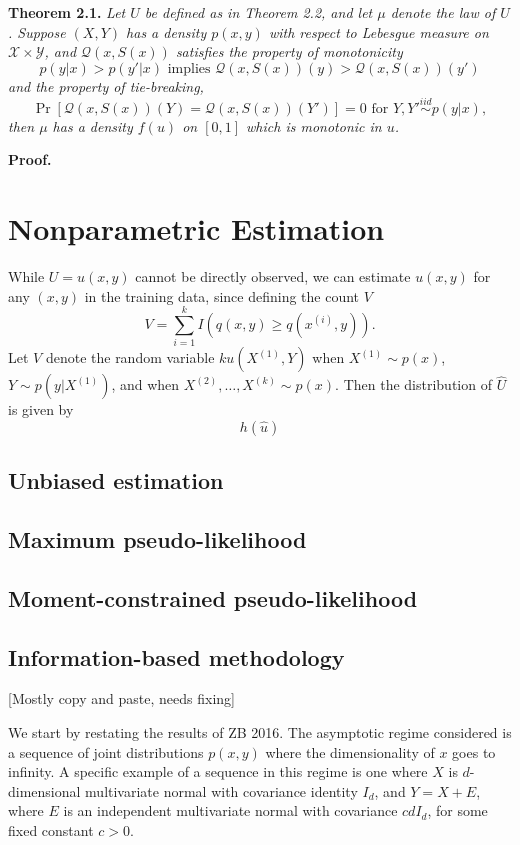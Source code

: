 \documentclass{article}
\begin{document}
\noindent\textbf{Theorem 2.1.} \emph{ Let $U$ be defined as in Theorem
  2.2, and let $\mu$ denote the law of $U$.  Suppose $(X, Y)$ has a density $p(x, y)$ with respect to 
  Lebesgue measure on $\mathcal{X} \times \mathcal{Y}$,
  and $\mathcal{Q}(x, S(x))$ satisfies the property of monotonicity
  \[
  p(y|x) > p(y'|x) \text{ implies } \mathcal{Q}(x, S(x))(y) > \mathcal{Q}(x, S(x))(y')
  \]
  and the property of tie-breaking,
  \[
  \Pr[\mathcal{Q}(x, S(x))(Y) = \mathcal{Q}(x, S(x))(Y')] = 0\text{ for }Y, Y' \stackrel{iid}{\sim} p(y|x),
  \]
  then $\mu$ has a density $f(u)$ on $[0, 1]$ which is monotonic in $u$.
}

\noindent\textbf{Proof.}


\section{Nonparametric Estimation}

While $U = u(x, y)$ cannot be directly observed, we can estimate $u(x, y)$ for any $(x, y)$ in the training data,
since defining the count $V$
\[
V = \sum_{i=1}^k I(q(x, y) \geq q(x^{(i)}, y)).
\]
Let $V$ denote the random variable $k u(X^{(1)}, Y)$ when $X^{(1)} \sim p(x)$,
$Y \sim p(y|X^{(1)})$, and when $X^{(2)},\hdots, X^{(k)} \sim p(x)$.
Then the distribution of $\hat{U}$ is given by
\[
h(\hat{u})
\]

\subsection{Unbiased estimation}

\subsection{Maximum pseudo-likelihood}

\subsection{Moment-constrained pseudo-likelihood}

\subsection{Information-based methodology}

[Mostly copy and paste, needs fixing]

We start by restating the results of ZB 2016.  The asymptotic regime
considered is a sequence of joint distributions $p(x,y)$ where the
dimensionality of $x$ goes to infinity.  A specific example of a
sequence in this regime is one where $X$ is $d$-dimensional
multivariate normal with covariance identity $I_d$, and $Y = X + E$,
where $E$ is an independent multivariate normal with covariance $cd
I_d$, for some fixed constant $c > 0$.
\end{document}
